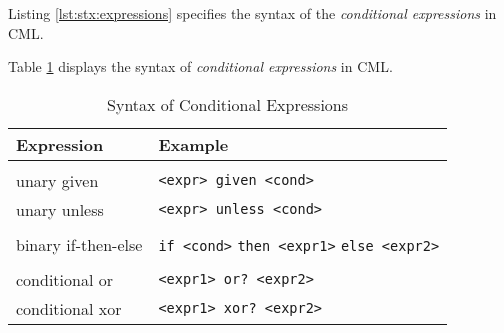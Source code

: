 Listing \ref{lst:stx:expressions} specifies the syntax of
the \emph{conditional expressions} in CML.

Table \ref{tab:conditional-expr-syntax} displays
the syntax of \emph{conditional expressions} in CML.

\begin{table}[H]
\centering
\begin{tabular}
{ l l }
\hline
Expression & Example \\
\hline
\\
unary given & \verb|<expr> given <cond>| \\
unary unless & \verb|<expr> unless <cond>| \\
\\
binary if-then-else & \verb|if <cond>| \verb|then <expr1>| \verb|else <expr2>| \\
\\
conditional or & \verb|<expr1> or? <expr2>| \\
conditional xor & \verb|<expr1> xor? <expr2>| \\
\end{tabular}
\caption{Syntax of Conditional Expressions}
\label{tab:conditional-expr-syntax}
\end{table}
